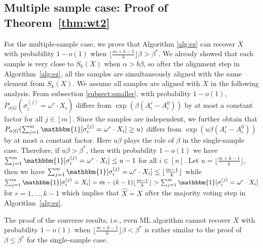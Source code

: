 \documentclass[conference]{IEEEtran}
\begin{document}
	\subsection{Multiple sample case: Proof of Theorem~\ref{thm:wt2}}
	\label{sect:multi}
	
	
	For the multiple-sample case,
	we prove that Algorithm \ref{alg:ez} can recover $X$ with probability $1-o(1)$ when $\lfloor \frac{m+k-1}{k} \rfloor \beta>\beta^\ast$.
	We already showed that each sample is very close to $S_k(X)$ when $\alpha > b \beta$,
	so after the alignment step in Algorithm~\ref{alg:ez},
	all the samples are simultaneously aligned with the same element from $S_k(X)$.
	We assume all samples are aligned with $X$ in the following analysis.
	From subsection \ref{subsect:smaller},
	with probability $1-o(1)$, $P_{\sigma|G}(\sigma_i^{(j)}  = \omega^r \cdot X_i)$ differs from
	$ \exp (\beta (A^r_i-A^0_i))$ by at most a constant factor for all $j\in[m]$.
	Since the samples are independent,
	we further obtain that $P_{\sigma|G}(\sum_{j=1}^m\mathbbm{1}[\sigma_i^{(j)}  = \omega^r \cdot X_i]\ge u)$ differs from
	$ \exp ( u \beta (A^r_i-A^0_i))$
	by at most a constant factor.
	Here $u\beta$ plays the role of $\beta$ in the single-sample case.
	Therefore, if $u\beta>\beta^\ast$, then with probability $1-o(1)$ we have $\sum_{j=1}^m\mathbbm{1}[\sigma_i^{(j)} = \omega^r \cdot X_i] \le u-1$ for all $i\in[n]$. Let $u=\lfloor \frac{m+k-1}{k} \rfloor$,
	then we have $\sum_{j=1}^m\mathbbm{1}[\sigma_i^{(j)}  = \omega^r \cdot X_i] \le \lfloor \frac{m-1}{k} \rfloor $
	while $\sum_{j=1}^m\mathbbm{1}[\sigma_i^{(j)} = X_i]
	= m - (k-1)\lfloor \frac{m-1}{k} \rfloor > \sum_{j=1}^m\mathbbm{1}[\sigma_i^{(j)}  = \omega^r \cdot X_i] $ for $r=1, \dots, k-1$
	which implies that $\hat{X}=X$ after the majority voting step in Algorithm~\ref{alg:ez}.
	
	The proof of the converse results, i.e., even ML algorithm cannot recover $X$ with probability $1-o(1)$ when
	$\lfloor \frac{m+k-1}{k} \rfloor  \beta < \beta^\ast$ is rather similar to the proof of $\beta\le\beta^\ast$ for the single-sample case.
	
	
	
\end{document}
